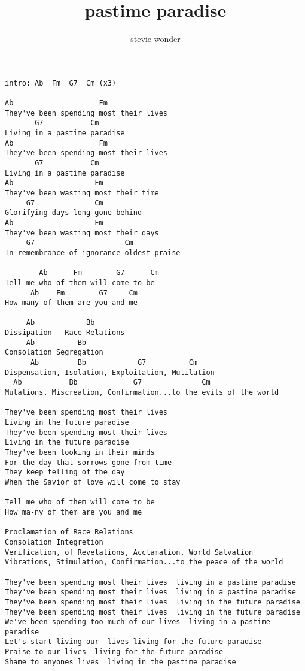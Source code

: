 \author{stevie wonder}
\title{pastime paradise}
\maketitle
\begin{verbatim}
intro: Ab  Fm  G7  Cm (x3) 

Ab                    Fm
They've been spending most their lives 
       G7           Cm 
Living in a pastime paradise 
Ab                    Fm
They've been spending most their lives 
       G7           Cm
Living in a pastime paradise 
Ab                   Fm
They've been wasting most their time 
     G7              Cm
Glorifying days long gone behind 
Ab                   Fm
They've been wasting most their days 
     G7                     Cm
In remembrance of ignorance oldest praise 

        Ab      Fm        G7      Cm 
Tell me who of them will come to be 
      Ab    Fm        G7     Cm 
How many of them are you and me 

     Ab            Bb 
Dissipation   Race Relations 
     Ab          Bb 
Consolation Segregation 
      Ab         Bb            G7          Cm 
Dispensation, Isolation, Exploitation, Mutilation 
  Ab           Bb             G7              Cm
Mutations, Miscreation, Confirmation...to the evils of the world 

They've been spending most their lives 
Living in the future paradise 
They've been spending most their lives 
Living in the future paradise 
They've been looking in their minds 
For the day that sorrows gone from time 
They keep telling of the day 
When the Savior of love will come to stay 

Tell me who of them will come to be 
How ma-ny of them are you and me

Proclamation of Race Relations 
Consolation Integretion 
Verification, of Revelations, Acclamation, World Salvation 
Vibrations, Stimulation, Confirmation...to the peace of the world 

They've been spending most their lives  living in a pastime paradise 
They've been spending most their lives  living in a pastime paradise 
They've been spending most their lives  living in the future paradise 
They've been spending most their lives  living in the future paradise 
We've been spending too much of our lives  living in a pastime paradise 
Let's start living our  lives living for the future paradise 
Praise to our lives  living for the future paradise 
Shame to anyones lives  living in the pastime paradise 
\end{verbatim}